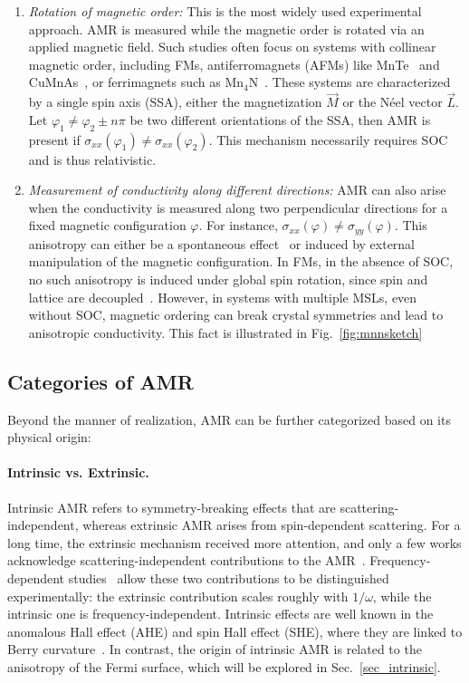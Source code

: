 \documentclass[prb,showpacs,amsmath,amssymb,superscriptaddress,twocolumn,floatfix]{revtex4-1}
\begin{document}
\begin{enumerate}
	\item \textit{Rotation of magnetic order:} This is the most widely used experimental approach. AMR is measured while the magnetic order is rotated via an applied magnetic field. Such studies often focus on systems with collinear magnetic order, including FMs, antiferromagnets (AFMs) like MnTe~\cite{Kriegner:2017, Gonzalez-Betancourt:2024} and CuMnAs~\cite{Volny:2020, Zubac:2021, Wadley:2016}, or ferrimagnets such as Mn$_4$N~\cite{Kabara:2017}. These systems are characterized by a single spin axis (SSA), either the magnetization $\vec{M}$ or the N\'eel vector $\vec{L}$. Let $\varphi_1 \neq \varphi_2 \pm n\pi$ be two different orientations of the SSA, then AMR is present if $\sigma_{xx}(\varphi_1) \neq \sigma_{xx}(\varphi_2)$. This mechanism necessarily requires SOC and is thus relativistic.
	
	\item \textit{Measurement of conductivity along different directions:} AMR can also arise when the conductivity is measured along two perpendicular directions for a fixed magnetic configuration $\varphi$. For instance, $\sigma_{xx}(\varphi) \neq \sigma_{yy}(\varphi)$. This anisotropy can either be a spontaneous effect~\cite{Bakonyi:2022} or induced by external manipulation of the magnetic configuration. In FMs, in the absence of SOC, no such anisotropy is induced under global spin rotation, since spin and lattice are decoupled~\cite{Gonzalez-Hernandez:2024}. However, in systems with multiple MSLs, even without SOC, magnetic ordering can break crystal symmetries and lead to anisotropic conductivity. This fact is illustrated in Fig.~\ref{fig:mnnsketch}
\end{enumerate}

\subsection{Categories of AMR}

Beyond the manner of realization, AMR can be further categorized based on its physical origin:

\paragraph{Intrinsic vs. Extrinsic.} Intrinsic AMR refers to symmetry-breaking effects that are scattering-independent, whereas extrinsic AMR arises from spin-dependent scattering. For a long time, the extrinsic mechanism received more attention, and only a few works acknowledge scattering-independent contributions to the AMR~\cite{Kato:2008, Velev:2005, Zeng:2020, Kato:2007, Nadvordnik:2021, Park:2021}. Frequency-dependent studies~\cite{Nadvordnik:2021, Park:2021} allow these two contributions to be distinguished experimentally: the extrinsic contribution scales roughly with $1/\omega$, while the intrinsic one is frequency-independent. Intrinsic effects are well known in the anomalous Hall effect (AHE) and spin Hall effect (SHE), where they are linked to Berry curvature~\cite{Nagaosa:2010, Zhang:2017}. In contrast, the origin of intrinsic AMR is related to the anisotropy of the Fermi surface, which will be explored in Sec.~\ref{sec_intrinsic}.
\end{document}
